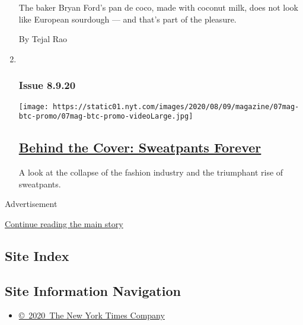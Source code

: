 \begin{enumerate}
  The baker Bryan Ford's pan de coco, made with coconut milk, does not
  look like European sourdough --- and that's part of the pleasure.

  By Tejal Rao
\item ~
  \hypertarget{issue-8920}{%
  \subsubsection{Issue 8.9.20}\label{issue-8920}}

  \texttt{[image: https://static01.nyt.com/images/2020/08/09/magazine/07mag-btc-promo/07mag-btc-promo-videoLarge.jpg]}

  \hypertarget{behind-the-cover-sweatpants-forever}{%
  \subsection{\texorpdfstring{\href{/2020/08/07/magazine/behind-the-cover-sweatpants-forever.html}{Behind
  the Cover: Sweatpants
  Forever}}{Behind the Cover: Sweatpants Forever}}\label{behind-the-cover-sweatpants-forever}}

  A look at the collapse of the fashion industry and the triumphant rise
  of sweatpants.
\end{enumerate}

Advertisement

\protect\hyperlink{after-mid1}{Continue reading the main story}

\hypertarget{site-index}{%
\subsection{Site Index}\label{site-index}}

\hypertarget{site-information-navigation}{%
\subsection{Site Information
Navigation}\label{site-information-navigation}}

\begin{itemize}
\tightlist
\item
  \href{https://help.nytimes.com/hc/en-us/articles/115014792127-Copyright-notice}{©~2020~The
  New York Times Company}
\end{itemize}

